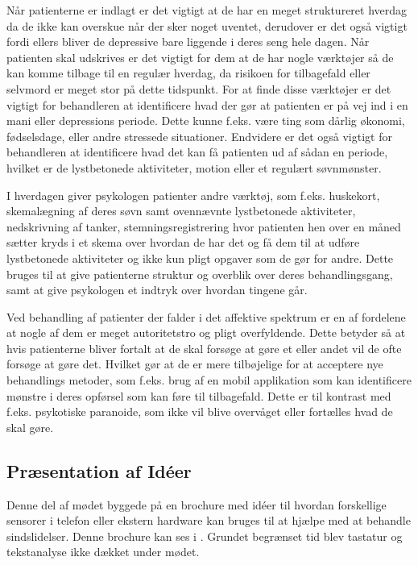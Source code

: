 Når patienterne er indlagt er det vigtigt at de har en meget struktureret hverdag da de ikke kan overskue når der sker noget uventet, derudover er det også vigtigt fordi ellers bliver de depressive bare liggende i deres seng hele dagen.
Når patienten skal udskrives er det vigtigt for dem at de har nogle værktøjer så de kan komme tilbage til en regulær hverdag, da risikoen for tilbagefald eller selvmord er meget stor på dette tidspunkt. 
For at finde disse værktøjer er det vigtigt for behandleren at identificere hvad der gør at patienten er på vej ind i en mani eller depressions periode.
Dette kunne f.eks. være ting som dårlig økonomi, fødselsdage, eller andre stressede situationer.
Endvidere er det også vigtigt for behandleren at identificere hvad det kan få patienten ud af sådan en periode, hvilket er de lystbetonede aktiviteter, motion eller et regulært søvnmønster.

I hverdagen giver psykologen patienter andre værktøj, som f.eks. huskekort, skemalægning af deres søvn samt ovennævnte lystbetonede aktiviteter, nedskrivning af tanker, stemningsregistrering hvor patienten hen over en måned sætter kryds i et skema over hvordan de har det og få dem til at udføre lystbetonede aktiviteter og ikke kun pligt opgaver som de gør for andre. 
Dette bruges til at give patienterne struktur og overblik over deres behandlingsgang, samt at give psykologen et indtryk over hvordan tingene går.  

Ved behandling af patienter der falder i det affektive spektrum er en af fordelene at nogle af dem er meget autoritetstro og pligt overfyldende.
Dette betyder så at hvis patienterne bliver fortalt at de skal forsøge at gøre et eller andet vil de ofte forsøge at gøre det.
Hvilket gør at de er mere tilbøjelige for at acceptere nye behandlings metoder, som f.eks. brug af en mobil applikation som kan identificere mønstre i deres opførsel som kan føre til tilbagefald. 
Dette er til kontrast med f.eks. psykotiske paranoide, som ikke vil blive overvåget eller fortælles hvad de skal gøre. 

\subsection{Præsentation af Idéer}\label{janne_ideer}
Denne del af mødet byggede på en brochure med idéer til hvordan forskellige sensorer i telefon eller ekstern hardware kan bruges til at hjælpe med at behandle sindslidelser. 
Denne brochure kan ses i .
Grundet begrænset tid blev tastatur og tekstanalyse ikke dækket under mødet.

